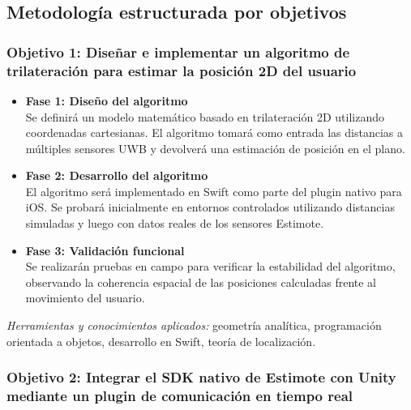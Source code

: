 \documentclass{article}
\begin{document}
\subsection{Metodología estructurada por objetivos}

\subsubsection{Objetivo 1: Diseñar e implementar un algoritmo de trilateración para estimar la posición 2D del usuario}


\begin{itemize}
    \item \textbf{Fase 1: Diseño del algoritmo} \\
    Se definirá un modelo matemático basado en trilateración 2D utilizando coordenadas cartesianas. El algoritmo tomará como entrada las distancias a múltiples sensores UWB y devolverá una estimación de posición en el plano.

    \item \textbf{Fase 2: Desarrollo del algoritmo} \\
    El algoritmo será implementado en Swift como parte del plugin nativo para iOS. Se probará inicialmente en entornos controlados utilizando distancias simuladas y luego con datos reales de los sensores Estimote.

    \item \textbf{Fase 3: Validación funcional} \\
    Se realizarán pruebas en campo para verificar la estabilidad del algoritmo, observando la coherencia espacial de las posiciones calculadas frente al movimiento del usuario.
\end{itemize}

\textit{Herramientas y conocimientos aplicados:} geometría analítica, programación orientada a objetos, desarrollo en Swift, teoría de localización.

\subsubsection{Objetivo 2: Integrar el SDK nativo de Estimote con Unity mediante un plugin de comunicación en tiempo real}
\end{document}
